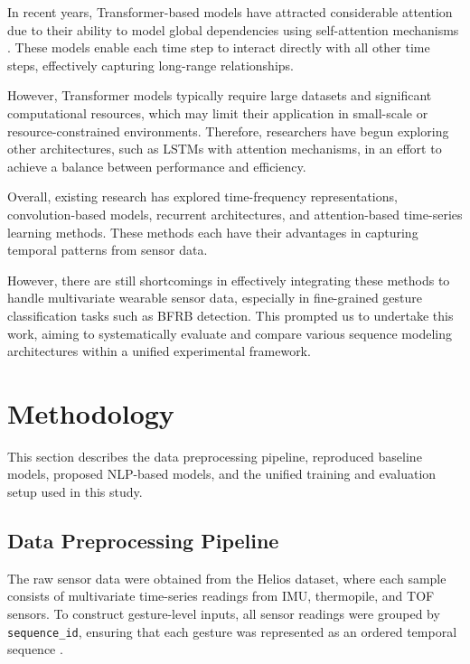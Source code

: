 \documentclass[conference]{IEEEtran}
\begin{document}
In recent years, Transformer-based models have attracted considerable attention due to their ability to model global dependencies using self-attention mechanisms \cite{vaswani2017attention}. These models enable each time step to interact directly with all other time steps, effectively capturing long-range relationships.

However, Transformer models typically require large datasets and significant computational resources, which may limit their application in small-scale or resource-constrained environments. Therefore, researchers have begun exploring other architectures, such as LSTMs with attention mechanisms, in an effort to achieve a balance between performance and efficiency.


\medskip
Overall, existing research has explored time-frequency representations, convolution-based models, recurrent architectures, and attention-based time-series learning methods. These methods each have their advantages in capturing temporal patterns from sensor data.

However, there are still shortcomings in effectively integrating these methods to handle multivariate wearable sensor data, especially in fine-grained gesture classification tasks such as BFRB detection. This prompted us to undertake this work, aiming to systematically evaluate and compare various sequence modeling architectures within a unified experimental framework.

\clearpage
\section{Methodology}
This section describes the data preprocessing pipeline, reproduced baseline models, proposed NLP-based models, and the unified training and evaluation setup used in this study.

\subsection{Data Preprocessing Pipeline}

The raw sensor data were obtained from the Helios dataset, where each sample consists of multivariate time-series readings from IMU, thermopile, and TOF sensors. To construct gesture-level inputs, all sensor readings were grouped by \texttt{sequence\_id}, ensuring that each gesture was represented as an ordered temporal sequence \cite{The_pandas_development_team_pandas-dev_pandas_Pandas}.
\end{document}
